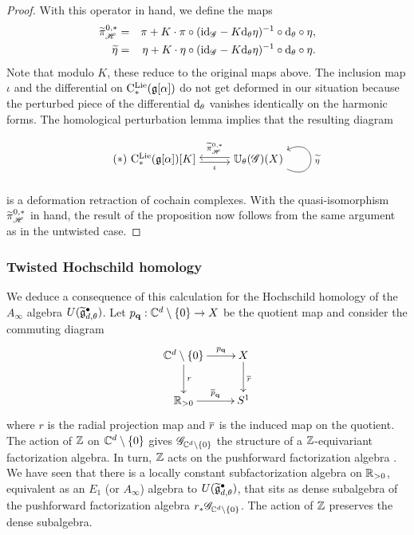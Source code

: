 \begin{proof}
With this operator in hand, we define the maps
\begin{eqnarray*}
\widetilde{\pi}^{0,*}_{\sH} & = & \pi + K \cdot \pi \circ (\id_{\sG} - K \d_\theta \eta)^{-1} \circ \d_\theta \circ \eta, \\
\widetilde{\eta} & = & \eta + K \cdot \eta \circ (\id_{\sG} - K \d_\theta \eta)^{-1} \circ \d_\theta \circ \eta .
\end{eqnarray*}
Note that modulo $K$, these reduce to the original maps above. 
The inclusion map $\iota$ and the differential on $\clieu_*(\fg[\alpha])$ do not get deformed in our situation because the perturbed piece of the differential $\d_{\theta}$ vanishes identically on the harmonic forms. 
The homological perturbation lemma implies that the resulting diagram
\begin{equation*}\tag{$\ast$}
  \begin{tikzpicture}[baseline=(L.base),anchor=base,->,auto,swap]
     \path node (L) {$\clieu_*(\fg[\alpha])[K]$} ++(3,0) node (M) {$\UU_\theta (\sG)(X) $} 
     (M.mid) +(0,.075) coordinate (raise) +(0,-.075) coordinate (lower);
     \draw (L.east |- lower) to node {$\scriptstyle \iota$} (M.west |- lower);
     \draw (M.west |- raise) to node {$\scriptstyle \Tilde{\pi}_{\sH}^{0,*} $} (L.east |- raise);
     \draw (M.south east) ..controls +(1,-.5) and +(1,.5) .. node {$\scriptstyle \Tilde{\eta}$} (M.north east);
  \end{tikzpicture}\end{equation*}
is a deformation retraction of cochain complexes. 
With the quasi-isomorphism $\Tilde{\pi}^{0,*}_\sH$ in hand, the result of the proposition now follows from the same argument as in the untwisted case. 
\end{proof}

\subsubsection{Twisted Hochschild homology}

We deduce a consequence of this calculation for the Hochschild homology of the $A_\infty$ algebra $U(\Tilde{\fg}^\bullet_{d,\theta})$.
Let $p_{\bf q} :  \CC^d \setminus \{0\} \to X$ be the quotient map and consider the commuting diagram
\[
\xymatrix{
\CC^d \setminus \{0\} \ar[r]^-{p_{\bf q}} \ar[d]^-{r} & X \ar[d]^{\Bar{r}} \\
\RR_{>0} \ar[r]^-{\Bar{p}_{\bf q}} & S^1
}
\]
where $r$ is the radial projection map and $\Bar{r}$ is the induced map on the quotient.
The action of $\ZZ$ on $\CC^d \setminus\{0\}$ gives $\sG_{\CC^d \setminus \{0\}}$ the structure of a $\ZZ$-equivariant factorization algebra. 
In turn, $\ZZ$ acts on the pushforward factorization algebra .
We have seen that there is a locally constant subfactorization algebra on $\RR_{>0}$, equivalent as an $E_1$ (or $A_\infty$) algebra to $U(\Tilde{\fg}^\bullet_{d,\theta})$, that sits as dense subalgebra of the pushforward factorization algebra $r_* \sG_{\CC^d \setminus \{0\}}$.
The action of $\ZZ$ preserves the dense subalgebra.

